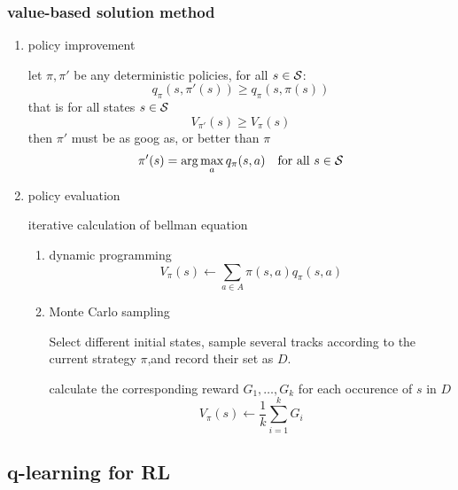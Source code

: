 \documentclass[11pt]{article}
\begin{document}
\subsubsection{value-based solution method}
\label{sec:org4e3d6ee}
\begin{enumerate}
\item policy improvement

let \(\pi,\pi'\) be any deterministic policies, for all \(s\in\mathcal{S}\):
\begin{equation*}
q_\pi(s,\pi'(s))\ge q_\pi(s,\pi(s))
\end{equation*}
that is for all states \(s\in\mathcal{S}\)
\begin{equation*}
V_{\pi'}(s)\ge V_\pi(s)
\end{equation*}
then \(\pi'\) must be as goog as, or better than \(\pi\)
\begin{equation*}
\pi'(s)=\arg\max_aq_\pi(s,a)\quad \text{for all } s\in\mathcal{S}
\end{equation*}
\item policy evaluation

iterative calculation of bellman equation
\begin{enumerate}
\item dynamic programming
\begin{equation*}
V_\pi(s)\leftarrow \displaystyle\sum_{a\in A}\pi(s,a)q_\pi(s,a)
\end{equation*}
\item Monte Carlo sampling

Select different initial states, sample several tracks according to
the current strategy \(\pi\),and record their set as \(D\). 

calculate the corresponding reward \(G_1,\dots,G_k\) for each occurence
of \(s\) in \(D\)
\begin{equation*}
V_\pi(s)\leftarrow\frac{1}{k}\displaystyle\sum_{i=1}^kG_i
\end{equation*}
\end{enumerate}
\end{enumerate}
\subsection{q-learning for RL}
\label{sec:org33da717}
\end{document}

